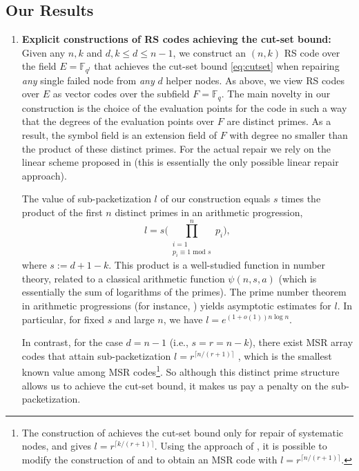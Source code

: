 \documentclass[11pt,onecolumn]{IEEEtran}
\newcommand{\ff}{{\mathbb F}}
\begin{document}
\subsection{Our Results}\label{sect:results}
\begin{enumerate}[(1)]
\item
{\bf Explicit constructions of RS codes achieving the cut-set bound:} Given any $n,k$ and $d, k\le d\le n-1$, we construct an $(n,k)$ RS code over the field $E=\ff_{q^l}$ that achieves the cut-set bound \eqref{eq:cutset} when repairing {\em any} single failed node from {\em any} $d$ helper nodes. As above, we view RS codes over $E$ as vector codes over the subfield $F=\ff_q$. 
The main novelty in our construction is the choice of the evaluation points for the code in such a way that the degrees of the {evaluation} points over $F$ are distinct primes. As a result, the symbol field is an extension field of $F$ with degree no smaller than the product of these distinct primes. For the actual repair we rely on the linear scheme proposed in \cite{Guruswami16} (this is essentially the only possible linear repair approach).

The value of sub-packetization $l$ of our construction equals $s$ times the product of the first $n$ 
distinct primes in an arithmetic progression, 
  $$
   l= s \biggl(\prod_{\substack{i=1\\[.02in]p_i\equiv 1\text{ mod } s}}^n p_i\biggr),
  $$
  where $s:= d+1-k.$ This product is a well-studied function in number theory, related to a classical arithmetic function $\psi(n,s,a)$  (which is essentially the sum of logarithms of the primes). The prime number theorem in arithmetic progressions (for instance, \cite[p.121]{IK04}) yields asymptotic estimates for $l$. In particular, for fixed $s$ and large $n$, we have $l= e^{(1+o(1)) n\log n}.$ 

In contrast, for the case $d=n-1$ (i.e., $s=r=n-k$), there exist MSR array codes that attain sub-packetization $l=r^{\lceil n/(r+1) \rceil}$ \cite{Wang16},
which is the smallest known value among MSR codes\footnote{ The construction of \cite{Wang16} achieves the cut-set bound only for repair of systematic nodes, and gives $l=r^{\lceil k/(r+1) \rceil}$. Using the approach of \cite{Ye16}, it is possible to modify the construction of \cite{Wang16} and to obtain an MSR code with $l=r^{\lceil n/(r+1) \rceil}$.}.  So although this  distinct prime structure allows us to achieve the cut-set bound, it makes us pay a penalty on the sub-packetization. 


\end{enumerate}
\end{document}
